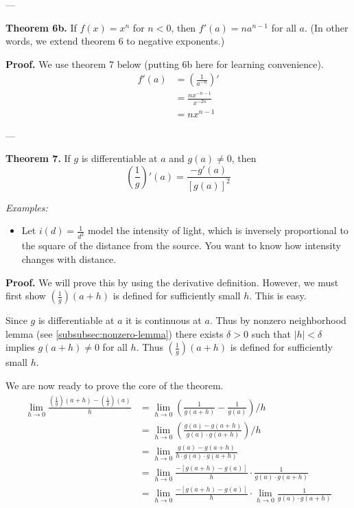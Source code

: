 ---\vs

\textbf{Theorem 6b.} If $f(x)=x^n$ for $n<0$, then $f'(a)=na^{n-1}$
for all $a$. (In other words, we extend theorem 6 to negative
exponents.)

\vs

\textbf{Proof.} We use theorem 7 below (putting 6b here for learning
convenience).
\begin{align*}
  f'(a)&=\left(\frac{1}{a^{-n}}\right)'\\
       &=\frac{nx^{-n-1}}{x^{-2n}}\\
       &=nx^{n-1}
\end{align*}

---\vs

\textbf{Theorem 7.} If $g$ is differentiable at $a$ and $g(a)\neq0$, then
\[\left(\frac{1}{g}\right)'(a)=\frac{-g'(a)}{{[g(a)]}^2}\]

\textit{Examples:}
\begin{itemize}
\item Let $i(d)=\frac{1}{d^2}$ model the intensity of light, which
  is inversely proportional to the square of the distance from the
  source. You want to know how intensity changes with distance.
\end{itemize}

\textbf{Proof.} We will prove this by using the derivative definition.
However, we must first show $\left(\frac{1}{g}\right)(a+h)$ is defined
for sufficiently small $h$. This is easy.

\vs

Since $g$ is differentiable at $a$ it is continuous at $a$. Thus by
nonzero neighborhood lemma (see \ref{subsubsec:nonzero-lemma}) there
exists $\delta>0$ such that $|h|<\delta$ implies $g(a+h)\neq0$ for all
$h$. Thus $\left(\frac{1}{g}\right)(a+h)$ is defined for sufficiently
small $h$.

\vs

We are now ready to prove the core of the theorem.
\begin{align*}
  \lim_{h\to0}\frac{\left(\frac{1}{g}\right)(a+h)-\left(\frac{1}{g}\right)(a)}{h}
  &=\lim_{h\to0}\left(\frac{1}{g(a+h)}-\frac{1}{g(a)}\right)/h\\
  &=\lim_{h\to0}\left(\frac{g(a)-g(a+h)}{g(a)\cdot g(a+h)}\right)/h\\
  &=\lim_{h\to0}\frac{g(a)-g(a+h)}{h\cdot g(a)\cdot g(a+h)}\\
  &=\lim_{h\to0}\frac{-[g(a+h)-g(a)]}{h}\cdot\frac{1}{g(a)\cdot g(a+h)}\\
  &=\lim_{h\to0}\frac{-[g(a+h)-g(a)]}{h}\cdot\lim_{h\to0}\frac{1}{g(a)\cdot
    g(a+h)}
\end{align*}

